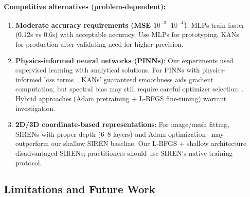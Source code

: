 \documentclass[11pt,a4paper]{article}
\begin{document}
\paragraph{Competitive alternatives (problem-dependent):}
\begin{enumerate}
    \item \textbf{Moderate accuracy requirements (MSE $10^{-3}$--$10^{-4}$)}: MLPs train faster (0.12s vs 0.6s) with acceptable accuracy. Use MLPs for prototyping, KANs for production after validating need for higher precision.
    \item \textbf{Physics-informed neural networks (PINNs)}: Our experiments used supervised learning with analytical solutions. For PINNs with physics-informed loss terms~\citep{raissi2019physics}, KANs' guaranteed smoothness aids gradient computation, but spectral bias may still require careful optimizer selection~\citep{krishnapriyan2021characterizing}. Hybrid approaches (Adam pretraining + L-BFGS fine-tuning) warrant investigation.
    \item \textbf{2D/3D coordinate-based representations}: For image/mesh fitting, SIRENs with proper depth (6--8 layers) and Adam optimization~\citep{sitzmann2020implicit} may outperform our shallow SIREN baseline. Our L-BFGS + shallow architecture disadvantaged SIRENs; practitioners should use SIREN's native training protocol.
\end{enumerate}

\subsection{Limitations and Future Work}
\end{document}
